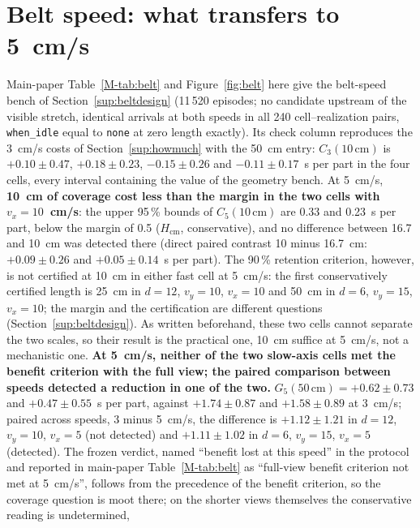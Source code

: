 \documentclass[11pt,a4paper]{article}
\begin{document}

\section{Belt speed: what transfers to 5~cm/s}\label{sup:belt}
Main-paper Table~\ref{M-tab:belt} and Figure~\ref{fig:belt} here give the belt-speed bench of
Section~\ref{sup:beltdesign} (11\,520 episodes; no candidate upstream of the visible
stretch, identical arrivals at both speeds in all 240 cell--realization pairs,
\texttt{when\_idle} equal to \texttt{none} at zero length exactly). Its check column
reproduces the 3~cm/s costs of Section~\ref{sup:howmuch} with the 50~cm entry: $C_3(10\,
\mathrm{cm})$ is $+0.10\pm0.47$, $+0.18\pm0.23$, $-0.15\pm0.26$ and $-0.11\pm0.17$~s per
part in the four cells, every interval containing the value of the geometry bench. At
5~cm/s, \textbf{10~cm of coverage cost less than the margin in the two cells with
$v_x=10$~cm/s}: the upper 95\,\% bounds of $C_5(10\,\mathrm{cm})$ are 0.33 and 0.23~s per
part, below the margin of 0.5 ($H_{\mathrm{cm}}$, conservative), and no difference
between 16.7 and 10~cm was detected there (direct paired contrast 10 minus 16.7~cm:
$+0.09\pm0.26$ and $+0.05\pm0.14$~s per part). The 90\,\% retention criterion, however,
is not certified at 10~cm in either fast cell at 5~cm/s: the first conservatively
certified length is 25~cm in $d=12$, $v_y=10$, $v_x=10$ and 50~cm in $d=6$, $v_y=15$,
$v_x=10$; the margin and the certification are different questions
(Section~\ref{sup:beltdesign}). As written beforehand, these two cells cannot separate the two scales,
so their result is the practical one, 10~cm suffice at 5~cm/s, not a mechanistic one.
\textbf{At 5~cm/s, neither of the two slow-axis cells met the benefit criterion with
the full view; the paired comparison between speeds detected a reduction in one of the
two.} $G_5(50\,\mathrm{cm})=+0.62\pm0.73$ and $+0.47\pm0.55$~s per part, against
$+1.74\pm0.87$ and $+1.58\pm0.89$ at 3~cm/s; paired across speeds, 3 minus 5~cm/s, the
difference is $+1.12\pm1.21$ in $d=12$, $v_y=10$, $v_x=5$ (not detected) and
$+1.11\pm1.02$ in $d=6$, $v_y=15$, $v_x=5$ (detected). The frozen verdict, named ``benefit lost at this speed'' in the protocol and reported
in main-paper Table~\ref{M-tab:belt} as ``full-view benefit criterion not met at 5~cm/s'', follows
from the precedence of the benefit criterion, so the coverage question
is moot there; on the shorter views themselves the conservative reading is undetermined,
\end{document}
